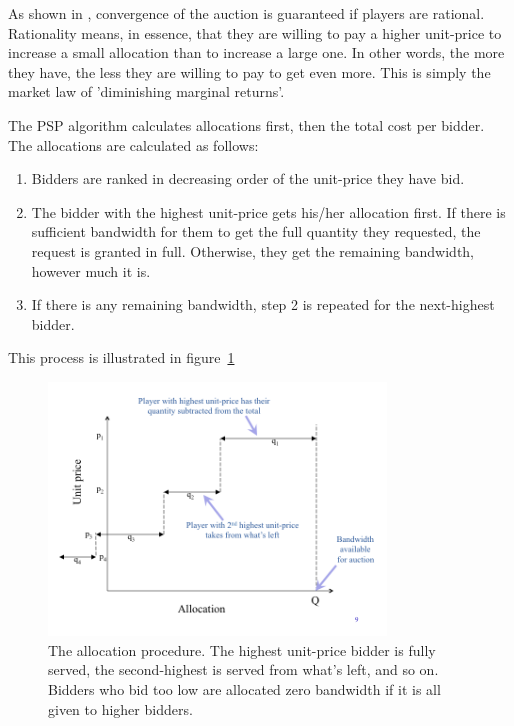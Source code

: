 As shown in \cite{PSP}, convergence of the auction is guaranteed if players are rational. Rationality means, in essence, that they are willing to pay a higher unit-price to increase a small allocation than to increase a large one. In other words, the more they have, the less they are willing to pay to get even more. This is simply the market law of 'diminishing marginal returns'.

The PSP algorithm calculates allocations first, then the total cost per bidder. The allocations are calculated as follows:

\begin{enumerate}
\item[1)] Bidders are ranked in decreasing order of the unit-price they have bid.
\item[2)] The bidder with the highest unit-price gets his/her allocation first. If there is sufficient bandwidth for them to get the full quantity they requested, the request is granted in full. Otherwise, they get the remaining bandwidth, however much it is.
\item[3)] If there is any remaining bandwidth, step 2 is repeated for the next-highest bidder.
\end{enumerate}

This process is illustrated in figure~\ref{fig:allocation}

\begin{figure}[h]
 \centering
   \includegraphics[width=0.8\textwidth]{allocation}
       \caption{The allocation procedure. The highest unit-price bidder is fully served, the second-highest is served from what's left, and so on. Bidders who bid too low are allocated zero bandwidth if it is all given to higher bidders.}
 \label{fig:allocation}
\end{figure}

